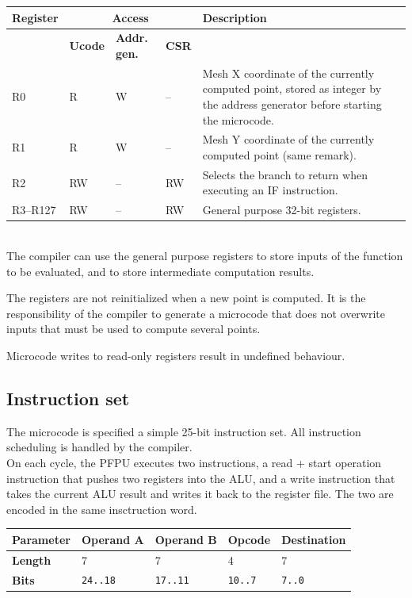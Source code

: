 \documentclass[a4paper,11pt]{article}
\begin{document}
\begin{tabularx}{\textwidth}{|l|l|l|l|X|}
\hline
\bf Register & \multicolumn{3}{|c|}{\bf Access} & \bf Description \\
\hline
 & \bf Ucode & \bf Addr. gen. & \bf CSR & \\
\hline
R0 & R & W & -- & Mesh X coordinate of the currently computed point, stored as integer by the address generator before starting the microcode. \\
\hline
R1 & R & W & -- & Mesh Y coordinate of the currently computed point (same remark). \\
\hline
R2 & RW & -- & RW & Selects the branch to return when executing an IF instruction. \\
\hline
R3--R127 & RW & -- & RW & General purpose 32-bit registers. \\
\hline
\end{tabularx}\\

The compiler can use the general purpose registers to store inputs of the function to be evaluated, and to store intermediate computation results.

The registers are not reinitialized when a new point is computed. It is the responsibility of the compiler to generate a microcode that does not overwrite inputs that must be used to compute several points.

Microcode writes to read-only registers result in undefined behaviour.

\subsection{Instruction set}
The microcode is specified a simple 25-bit instruction set. All instruction scheduling is handled by the compiler. \\

On each cycle, the PFPU executes two instructions, a read + start operation instruction that pushes two registers into the ALU, and a write instruction that takes the current ALU result and writes it back to the register file. The two are encoded in the same insctruction word. \\

\begin{tabular}{|l|l|l|l|l|}
\hline
\bf Parameter & Operand A & Operand B &  Opcode & Destination \\
\hline
\bf Length & 7 & 7 & 4 & 7 \\
\hline
\bf Bits & \verb!24..18! & \verb!17..11! & \verb!10..7! & \verb!7..0! \\
\hline
\end{tabular}\\
\end{document}
